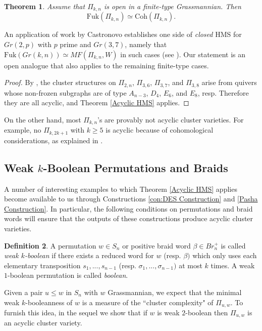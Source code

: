 \documentclass[11pt]{amsart}
\newtheorem{thm}{Theorem}[section]
\theoremstyle{definition}
\newtheorem{defn}[thm]{Definition}
\theoremstyle{remark}
\newcommand{\Coh}{\mathrm{Coh}}
\newcommand{\Fuk}{\mathrm{Fuk}}
\numberwithin{equation}{section}
\begin{document}
\begin{thm}
    Assume that $\Pi_{k,n}$ is open in a finite-type Grassmannian. Then $$\Fuk(\Pi_{k,n}) \simeq \Coh(\Pi_{k,n}).$$
\end{thm}

An application of work by Castronovo establishes one side of \textit{closed} HMS for $Gr(2, p)$ with $p$ prime and $Gr(3,7)$, namely that $\Fuk(Gr(k,n)) \simeq MF(\Pi_{k,n}, W)$ in such cases (see \cite{castronovo2020fukaya}). Our statement is an open analogue that also applies to the remaining finite-type cases.

\begin{proof}
    By \cite{SSBW}, the cluster structures on $\Pi_{2,n}$, $\Pi_{3,6}$, $\Pi_{3,7}$, and $\Pi_{3,8}$ arise from quivers whose non-frozen subgraphs are of type $A_{n-3}$, $D_4$, $E_6$, and $E_8$, resp. Therefore they are all acyclic, and Theorem \ref{Acyclic HMS} applies.
\end{proof}

On the other hand, most $\Pi_{k,n}$'s are provably not acyclic cluster varieties. For example, no $\Pi_{k,2k+1}$ with $k \geq 5$ is acyclic because of cohomological considerations, as explained in \cite{LSII}.

\subsection{Weak $k$-Boolean Permutations and Braids}

A number of interesting examples to which Theorem \ref{Acyclic HMS} applies become available to us through Constructions \ref{con:DES Construction} and \ref{Pasha Construction}. In particular, the following conditions on permutations and braid words will ensure that the outputs of these constructions produce acyclic cluster varieties.

\begin{defn}
    A permutation $w \in S_n$ or positive braid word $\beta \in Br_n^+$ is called \textit{weak $k$-boolean} if there exists a reduced word for $w$ (resp. $\beta)$ which only uses each elementary transposition $s_1, ..., s_{n-1}$ (resp. $\sigma_1, ..., \sigma_{n-1})$ at most $k$ times. A weak  $1$-boolean permutation is called \textit{boolean}.
\end{defn}

Given a pair $u \leq w$ in $S_n$ with $w$ Grassmannian, we expect that the minimal weak $k$-booleanness of $w$ is a measure of the ``cluster complexity" of $\Pi_{u,w}$. To furnish this idea, in the sequel we show that if $w$ is weak $2$-boolean then $\Pi_{u,w}$ is an acyclic cluster variety.
\end{document}
